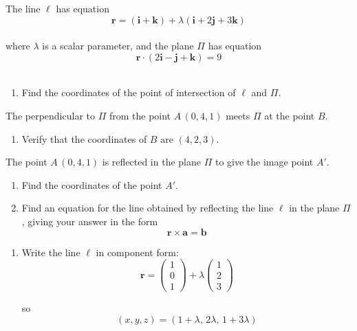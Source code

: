 \documentclass[leqno]{article}
\begin{document}
\begin{enumerate}[
  label=\textbf{\arabic*.},
  leftmargin=*,
  topsep=0pt,
  partopsep=0pt,
  parsep=0pt
]
The line $\ell$ has equation
\[
\mathbf{r}=(\mathbf{i}+\mathbf{k})+\lambda(\mathbf{i}+2\mathbf{j}+3\mathbf{k})
\] \\
where $\lambda$ is a scalar parameter, and the plane $\Pi$ has equation
\[
\mathbf{r}\cdot(2\mathbf{i}-\mathbf{j}+\mathbf{k})=9
\] \\
\begin{enumerate}[label=\textbf{(\alph*)}]
  \item Find the coordinates of the point of intersection of $\ell$ and $\Pi$.  \\
\end{enumerate}
The perpendicular to $\Pi$ from the point $A\,(0,4,1)$ meets $\Pi$ at the point $B$. \\
\begin{enumerate}[label=\textbf{(\alph*)}, resume]
  \item Verify that the coordinates of $B$ are $(4,2,3)$.  \\
\end{enumerate}
The point $A\,(0,4,1)$ is reflected in the plane $\Pi$ to give the image point $A'$. \\
\begin{enumerate}[label=\textbf{(\alph*)}, resume]
  \item Find the coordinates of the point $A'$.  \\
  \item Find an equation for the line obtained by reflecting the line $\ell$ in the plane $\Pi$, giving your answer in the form
  \[
  \mathbf{r}\times\mathbf{a}=\mathbf{b}
  \]
\end{enumerate}

\vspace*{10pt}

\begin{djsSolution}
\begin{enumerate}[label=\textbf{(\alph*)}]
  \item Write the line \(\ell\) in component form:
  \[
  \mathbf r=\begin{pmatrix}1\\0\\1\end{pmatrix}+\lambda\begin{pmatrix}1\\2\\3\end{pmatrix}
  \]

  so
  \[
  (x,y,z)=(1+\lambda,\,2\lambda,\,1+3\lambda)
  \]


\end{enumerate}
\end{djsSolution}
\end{enumerate}
\end{document}
